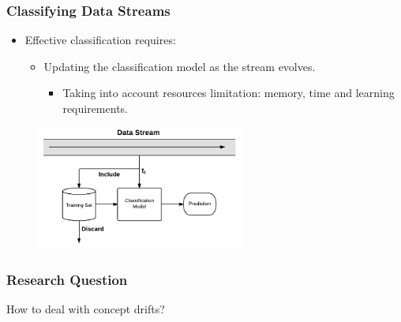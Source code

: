 \documentclass[14pt]{beamer}
\begin{document}


\begin{frame}\frametitle{Classifying Data Streams}

\begin{itemize}
\item Effective classification requires:
\begin{itemize}
\item Updating the classification model as the stream evolves.
\begin{itemize}
\item Taking into account resources limitation: memory, time and learning requirements.
\end{itemize}
\end{itemize}
\end{itemize}

\vspace{-0.2in}
\begin{figure}
\centering
\includegraphics[height=1.60in]{Stream2}
\end{figure}
\end{frame}


\begin{frame}\frametitle{Research Question}

\begin{center}
\large{How to deal with concept drifts?}
\end{center}
\end{frame}
\end{document}
